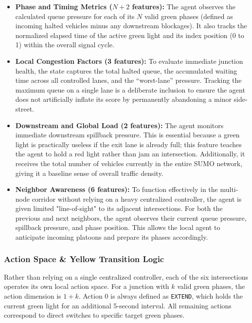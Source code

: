 \documentclass[conference]{IEEEtran}
\begin{document}
\begin{itemize}
    \item \textbf{Phase and Timing Metrics ($N + 2$ features):} The agent observes the calculated queue pressure for each of its $N$ valid green phases (defined as incoming halted vehicles minus any downstream blockages). It also tracks the normalized elapsed time of the active green light and its index position (0 to 1) within the overall signal cycle.

    \item \textbf{Local Congestion Factors (3 features):} To evaluate immediate junction health, the state captures the total halted queue, the accumulated waiting time across all controlled lanes, and the ``worst-lane'' pressure. Tracking the maximum queue on a single lane is a deliberate inclusion to ensure the agent does not artificially inflate its score by permanently abandoning a minor side-street.

    \item \textbf{Downstream and Global Load (2 features):} The agent monitors immediate downstream spillback pressure. This is essential because a green light is practically useless if the exit lane is already full; this feature teaches the agent to hold a red light rather than jam an intersection. Additionally, it receives the total number of vehicles currently in the entire SUMO network, giving it a baseline sense of overall traffic density.

    \item \textbf{Neighbor Awareness (6 features):} To function effectively in the multi-node corridor without relying on a heavy centralized controller, the agent is given limited "line-of-sight" to its adjacent intersections. For both the previous and next neighbors, the agent observes their current queue pressure, spillback pressure, and phase position. This allows the local agent to anticipate incoming platoons and prepare its phases accordingly.
\end{itemize}

\subsubsection{Action Space \& Yellow Transition Logic}
Rather than relying on a single centralized controller, each of the six intersections operates its own local action space. For a junction with $k$ valid green phases, the action dimension is $1 + k$. Action 0 is always defined as \texttt{EXTEND}, which holds the current green light for an additional 5-second interval. All remaining actions correspond to direct switches to specific target green phases.
\end{document}
